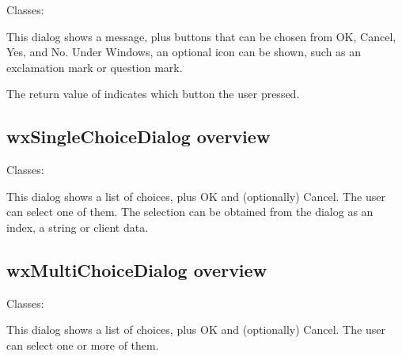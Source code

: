 Classes: 

This dialog shows a message, plus buttons that can be chosen from OK, Cancel, Yes, and No.
Under Windows, an optional icon can be shown, such as an exclamation mark or question mark.

The return value of  indicates
which button the user pressed.

\subsection{wxSingleChoiceDialog overview}\label{wxsinglechoicedialogoverview}

Classes: 

This dialog shows a list of choices, plus OK and (optionally) Cancel. The user can
select one of them. The selection can be obtained from the dialog as an index,
a string or client data.

\subsection{wxMultiChoiceDialog overview}\label{wxmultichoicedialogoverview}

Classes: 

This dialog shows a list of choices, plus OK and (optionally) Cancel. The user can
select one or more of them.

